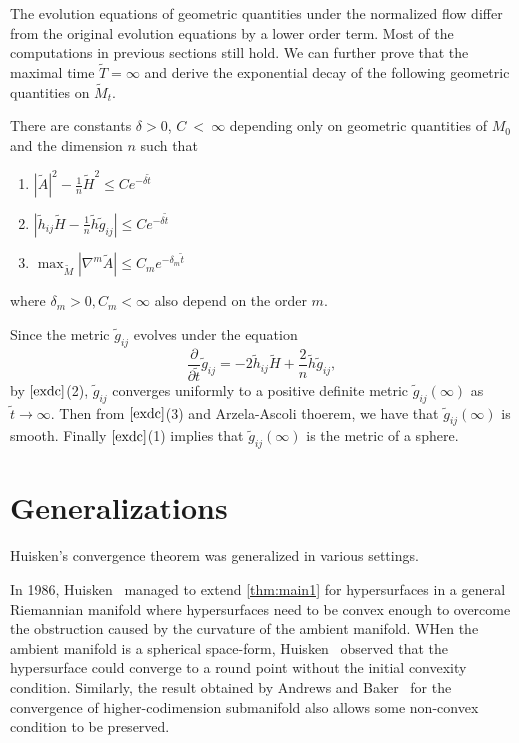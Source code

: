 The evolution equations of geometric quantities under the normalized flow differ from the original evolution equations by a lower order term. Most of the computations in previous sections still hold. We can further prove that the maximal time $\tilde{T}=\infty $ and derive the exponential decay of the following geometric quantities on $\tilde{M}_t$.
\begin{lemma}  \label{exdc}
	There are constants $\delta >0$, $C~<~\infty $ depending only on geometric quantities of $M_0$ and the dimension $n$ such that
	\begin{enumerate}[\normalfont(1)]
		\item $| \tilde{A} | ^2-\frac{1}{n}\tilde{H}^2 \leq Ce^{-\delta \tilde{t}}$ 
		\item $\left| \tilde{h}_{ij} \tilde{H} - \frac{1}{n}\tilde{h}\tilde{g}_{ij }^{}  \right|\leq Ce^{-\delta \tilde{t}}$ 
		\item $\max_{\tilde{M}}\left| \nabla_{}^{m} \tilde{A} \right| \leq C_m e^{-\delta _m \tilde{t}}$  
	\end{enumerate}
	where $\delta_m>0, C_m< \infty $ also depend on the order $m$.
\end{lemma} 
Since the metric $\tilde{g}_{ij }^{} $ evolves under the equation \[\frac{\partial }{\partial \tilde{t}} \tilde{g}_{ij }^{} = -2\tilde{h}_{ij} \tilde{H} +\frac{2}{n}\tilde{h}\tilde{g}_{ij }^{},\]
by $\autoref{exdc}$(2), $\tilde{g}_{ij }^{}$ converges uniformly to a positive definite metric $\tilde{g}_{ij }^{} (\infty )$ as $\tilde{t} \to \infty $. Then from $\autoref{exdc}$(3) and Arzela-Ascoli thoerem, we have that $\tilde{g}_{ij }^{} (\infty )$ is smooth. Finally $\autoref{exdc}$(1) implies that $\tilde{g}_{ij }^{} (\infty )$ is the metric of a sphere.
\section{Generalizations}

Huisken's convergence theorem was generalized in various settings.

In 1986, Huisken~\cite{huisken_contracting_1986} managed to extend \autoref{thm:main1} for hypersurfaces in a general Riemannian manifold where hypersurfaces need to be convex enough to overcome the obstruction caused by the curvature of the ambient manifold. WHen the ambient manifold is a spherical space-form, Huisken~\cite{huisken_deforming_1987} observed that the hypersurface could converge to a round point without the initial convexity condition. Similarly, the result obtained by Andrews and Baker~\cite{andrews_mean_2010} for the convergence of higher-codimension submanifold also allows some non-convex condition to be preserved.

